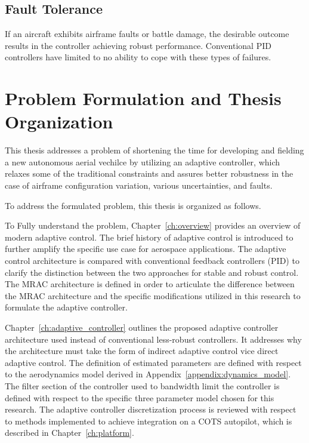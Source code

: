 \subsection{Fault Tolerance}
If an aircraft exhibits airframe faults or battle damage, the desirable outcome results in the controller achieving robust performance.  Conventional \ac{PID} controllers have limited to no ability to cope with these types of failures.

\section{Problem Formulation and Thesis Organization}

This thesis addresses a problem of shortening the time for developing and fielding a new autonomous aerial vechilce by utilizing an adaptive controller, which relaxes some of the traditional constraints and assures better robustness in the case of airframe configuration variation, various uncertainties, and faults.  

To address the formulated problem, this thesis is organized as follows.

To Fully understand the problem, Chapter~\ref{ch:overview} provides an overview of modern adaptive control.  The brief history of adaptive control is introduced to further amplify the specific use case for aerospace applications.  The adaptive control architecture is compared with conventional feedback controllers (\ac{PID}) to clarify the distinction between the two approaches for stable and robust control.  The \ac{MRAC} architecture is defined in order to articulate the difference between the \ac{MRAC} architecture and the specific modifications utilized in this research to formulate the \Lone adaptive controller.

Chapter~\ref{ch:adaptive_controller} outlines the proposed adaptive controller architecture used instead of conventional less-robust controllers.  It addresses why the architecture must take the form of indirect adaptive control vice direct adaptive control.  The definition of estimated parameters are defined with respect to the aerodynamics model derived in Appendix~\ref{appendix:dynamics_model}.  The filter section of the controller used to bandwidth limit the controller is defined with respect to the specific three parameter model chosen for this research.  The \Lone adaptive controller discretization process is reviewed with respect to methods implemented to achieve integration on a \ac{COTS} autopilot, which is described in Chapter~\ref{ch:platform}.

